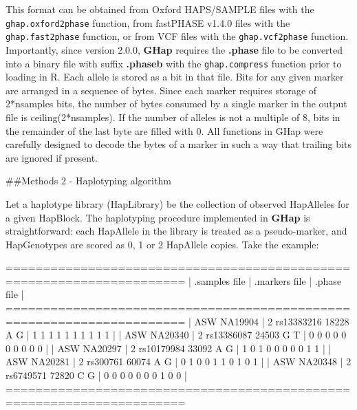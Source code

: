 \documentclass[
]{article}
\newenvironment{Shaded}{}{}
\newcommand{\DecValTok}[1]{#1}
\newcommand{\NormalTok}[1]{#1}
\begin{document}
This format can be obtained from Oxford HAPS/SAMPLE files with the
\texttt{ghap.oxford2phase} function, from fastPHASE v1.4.0 files with
the \texttt{ghap.fast2phase} function, or from VCF files with the
\texttt{ghap.vcf2phase} function. Importantly, since version 2.0.0,
\textbf{GHap} requires the \textbf{.phase} file to be converted into a
binary file with suffix \textbf{.phaseb} with the \texttt{ghap.compress}
function prior to loading in R. Each allele is stored as a bit in that
file. Bits for any given marker are arranged in a sequence of bytes.
Since each marker requires storage of 2*nsamples bits, the number of
bytes consumed by a single marker in the output file is
ceiling(2*nsamples). If the number of alleles is not a multiple of 8,
bits in the remainder of the last byte are filled with 0. All functions
in GHap were carefully designed to decode the bytes of a marker in such
a way that trailing bits are ignored if present.

\pagebreak

\#\#Methods 2 - Haplotyping algorithm

Let a haplotype library (HapLibrary) be the collection of observed
HapAlleles for a given HapBlock. The haplotyping procedure implemented
in \textbf{GHap} is straightforward: each HapAllele in the library is
treated as a pseudo-marker, and HapGenotypes are scored as 0, 1 or 2
HapAllele copies. Take the example:

\begin{Shaded}
\begin{Highlighting}[]
\NormalTok{======================================================================}
\NormalTok{|  .samples file  |      .markers file       |      .phase file      |}
\NormalTok{======================================================================}
\NormalTok{|  ASW NA19904    |  }\DecValTok{2}\NormalTok{ rs13383216 }\DecValTok{18228}\NormalTok{ A G  |  }\DecValTok{1} \DecValTok{1} \DecValTok{1} \DecValTok{1} \DecValTok{1} \DecValTok{1} \DecValTok{1} \DecValTok{1} \DecValTok{1} \DecValTok{1}\NormalTok{  |}
\NormalTok{|  ASW NA20340    |  }\DecValTok{2}\NormalTok{ rs13386087 }\DecValTok{24503}\NormalTok{ G T  |  }\DecValTok{0} \DecValTok{0} \DecValTok{0} \DecValTok{0} \DecValTok{0} \DecValTok{0} \DecValTok{0} \DecValTok{0} \DecValTok{0} \DecValTok{0}\NormalTok{  |}
\NormalTok{|  ASW NA20297    |  }\DecValTok{2}\NormalTok{ rs10179984 }\DecValTok{33092}\NormalTok{ A G  |  }\DecValTok{1} \DecValTok{0} \DecValTok{1} \DecValTok{0} \DecValTok{0} \DecValTok{0} \DecValTok{0} \DecValTok{0} \DecValTok{1} \DecValTok{1}\NormalTok{  |}
\NormalTok{|  ASW NA20281    |  }\DecValTok{2}\NormalTok{ rs300761   }\DecValTok{60074}\NormalTok{ A G  |  }\DecValTok{0} \DecValTok{1} \DecValTok{0} \DecValTok{0} \DecValTok{1} \DecValTok{1} \DecValTok{0} \DecValTok{1} \DecValTok{0} \DecValTok{1}\NormalTok{  |}
\NormalTok{|  ASW NA20348    |  }\DecValTok{2}\NormalTok{ rs6749571  }\DecValTok{72820}\NormalTok{ C G  |  }\DecValTok{0} \DecValTok{0} \DecValTok{0} \DecValTok{0} \DecValTok{0} \DecValTok{0} \DecValTok{0} \DecValTok{1} \DecValTok{0} \DecValTok{0}\NormalTok{  |}
\NormalTok{======================================================================}
\end{Highlighting}
\end{Shaded}
\end{document}
